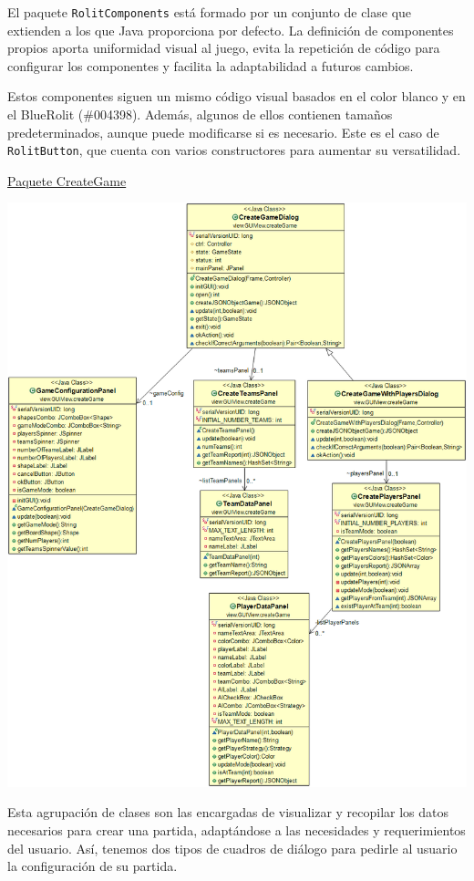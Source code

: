 \documentclass[12pt,a4paper,openright]{book}
\theoremstyle{break}
\begin{document}
El paquete \texttt{RolitComponents} está formado por un conjunto de clase que extienden a los que Java proporciona por defecto. La definición de componentes propios aporta uniformidad visual al juego, evita la repetición de código para configurar los componentes y facilita la adaptabilidad a futuros cambios.

Estos componentes siguen un mismo código visual basados en el color blanco y en el BlueRolit (\#004398). Además, algunos de ellos contienen tamaños predeterminados, aunque puede modificarse si es necesario. Este es el caso de \texttt{RolitButton}, que cuenta con varios constructores para aumentar su versatilidad.

\newpage
\underline{Paquete CreateGame}
\begin{center}
\includegraphics[scale=0.38]{CreateGamePaq.png} 
\end{center}

Esta agrupación de clases son las encargadas de visualizar y recopilar los datos necesarios para crear una partida, adaptándose a las necesidades y requerimientos del usuario. Así, tenemos dos tipos de cuadros de diálogo para pedirle al usuario la configuración de su partida.
\end{document}
